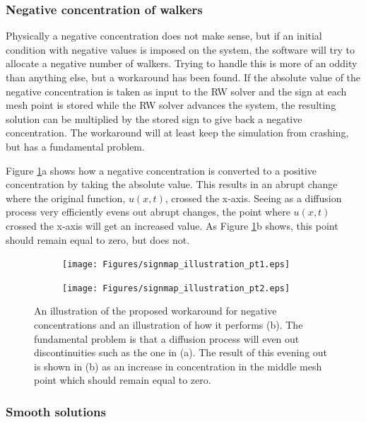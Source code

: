  
\subsubsection{Negative concentration of walkers}
Physically a negative concentration does not make sense, but if an initial condition with negative values is imposed on the system, the software will try to allocate a negative number of walkers. 
Trying to handle this is more of an oddity than anything else, but a workaround has been found. 
If the absolute value of the negative concentration is taken as input to the RW solver and the sign at each mesh point is stored while the RW solver advances the system, the resulting solution can be multiplied by the stored sign to give back a negative concentration. 
The workaround will at least keep the simulation from crashing, but has a fundamental problem. 

Figure \ref{theory:signmap_illustration}a shows how a negative concentration is converted to a positive concentration by taking the absolute value. This results in an abrupt change where the original function, $u(x,t)$, crossed the x-axis. Seeing as a diffusion process very efficiently evens out abrupt changes, the point where $u(x,t)$ crossed the x-axis will get an increased value. As Figure \ref{theory:signmap_illustration}b shows, this point should remain equal to zero, but does not.

  
\begin{figure}[H]
\centering
\begin{subfigure}[t!]{0.48\textwidth}
 \texttt{[image: Figures/signmap\_illustration\_pt1.eps]}
 \caption{}
\end{subfigure}
\begin{subfigure}[t!]{0.48\textwidth}
 \texttt{[image: Figures/signmap\_illustration\_pt2.eps]}
 \caption{}
\end{subfigure}
\caption[Workaround for negative concentrations, illustration]{An illustration of the proposed workaround for negative concentrations and an illustration of how it performs (b). The fundamental problem is that a diffusion process will even out discontinuities such as the one in (a). The result of this evening out is shown in (b) as an increase in concentration in the middle mesh point which should remain equal to zero.}
\label{theory:signmap_illustration}
 \end{figure}

\subsubsection{Smooth solutions}

